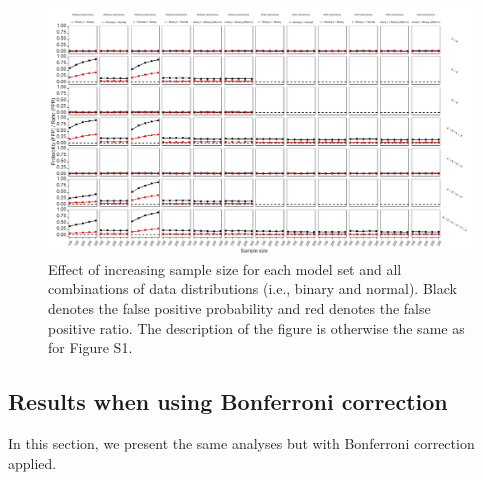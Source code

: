 \begin{figure}[hbt!]
\includegraphics{R/Analysis/Result/Figures/Figure1DSI.jpeg}
\centering
\caption{Effect of increasing sample size for each model set and all combinations of data distributions (i.e., binary and normal). Black denotes the false positive probability and red denotes the false positive ratio. The description of the figure is otherwise the same as for Figure S1.}
\label{fig:mainfigure}
\end{figure}

\clearpage
\subsection{Results when using Bonferroni correction}
In this section, we present the same analyses but with Bonferroni correction applied. 


